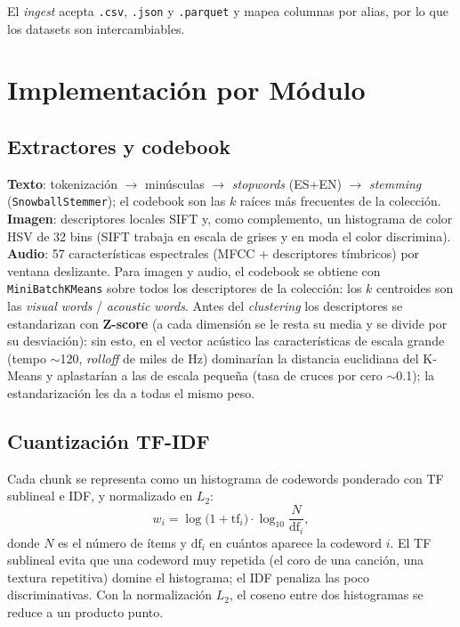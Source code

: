 \documentclass[conference]{IEEEtran}
\begin{document}
El \textit{ingest} acepta \texttt{.csv}, \texttt{.json} y \texttt{.parquet}
y mapea columnas por alias, por lo que los datasets son intercambiables.

\section{Implementación por Módulo}

\subsection{Extractores y codebook}
\textbf{Texto}: tokenización $\rightarrow$ minúsculas $\rightarrow$
\textit{stopwords} (ES+EN) $\rightarrow$ \textit{stemming}
(\texttt{SnowballStemmer}); el codebook son las $k$ raíces más frecuentes de
la colección. \textbf{Imagen}: descriptores locales SIFT y, como
complemento, un histograma de color HSV de 32 bins (SIFT trabaja en escala de
grises y en moda el color discrimina). \textbf{Audio}: 57 características
espectrales (MFCC + descriptores tímbricos) por ventana deslizante. Para
imagen y audio, el codebook se obtiene con \texttt{MiniBatchKMeans} sobre
todos los descriptores de la colección: los $k$ centroides son las
\textit{visual words} / \textit{acoustic words}. Antes del \textit{clustering}
los descriptores se estandarizan con \textbf{Z-score} (a cada dimensión se le
resta su media y se divide por su desviación): sin esto, en el vector acústico
las características de escala grande (tempo $\sim$120, \textit{rolloff} de
miles de Hz) dominarían la distancia euclidiana del K-Means y aplastarían a
las de escala pequeña (tasa de cruces por cero $\sim$0.1); la estandarización
les da a todas el mismo peso.

\subsection{Cuantización TF-IDF}
Cada chunk se representa como un histograma de codewords ponderado con TF
sublineal e IDF, y normalizado en $L_2$:
\begin{equation}
  w_{i} = \log\!\big(1+\mathrm{tf}_{i}\big)\cdot
          \log_{10}\!\frac{N}{\mathrm{df}_{i}},
\end{equation}
donde $N$ es el número de ítems y $\mathrm{df}_i$ en cuántos aparece la
codeword $i$. El TF sublineal evita que una codeword muy repetida (el coro de
una canción, una textura repetitiva) domine el histograma; el IDF penaliza
las poco discriminativas. Con la normalización $L_2$, el coseno entre dos
histogramas se reduce a un producto punto.
\end{document}
